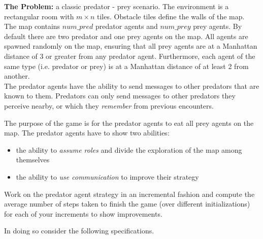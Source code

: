 \documentclass[a4paper, 12pt, twoside]{article}
\begin{document}
\spk{-2ex}

\vspace*{-6ex}\spk{1.2ex}

\textbf{The Problem:} a classic predator - prey scenario. The environment is a rectangular room with $m\times n$ tiles.
Obstacle tiles define the walls of the map.\\
%
The map contains $num\_pred$ predator agents and $num\_prey$ prey agents. By default there are two predator and one prey agents on the map. All agents are spawned randomly on the map, ensuring that all prey agents are at a Manhattan distance of 3 or greater from any predator agent. Furthermore, each agent of the same type (i.e. predator or prey) is at a Manhattan distance of at least 2 from another.\\
%

The predator agents have the ability to send messages to other predators that are known to them. Predators can only send messages to other predators they perceive nearby, or which they \textit{remember} from previous encounters.

The purpose of the game is for the predator agents to eat all prey agents on the map. 
The predator agents have to show two abilities:
\begin{itemize}
	\item the ability to \textit{assume roles} and divide the exploration of the map among themselves
	\item the ability to \textit{use communication} to improve their strategy
\end{itemize}

Work on the predator agent strategy in an incremental fashion and compute the average number of steps taken to finish the game (over different initializations) for each of your increments to show improvements.

In doing so consider the following specifications.

\end{document}

